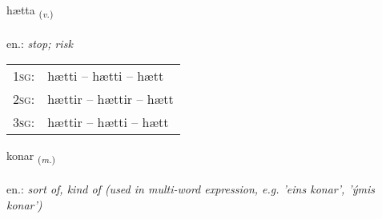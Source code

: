 \documentclass[frontgrid, backgrid]{flacards}\usepackage[]{graphicx}\usepackage[]{xcolor}
\begin{document}
\renewcommand{\blhead}{\vskip5pt {\small\bfseries\footnotesize Sagnorð | Verb }}
\renewcommand{\bcfoot}{\vskip5pt \hspace{2pt}{\small\bfseries\footnotesize 1K}}


{hætta \small{\textsubscript{(\textit{v.})}} \\[1ex] %
\textphonetic{[haihta]} \\
en.: \emph{stop; risk} \\  [2ex]
\renewcommand*{\arraystretch}{0.8}
\begin{tabular}{p{1cm}l}
\textsc{1sg}: & hætti -- hætti -- hætt \\ 
\textsc{2sg}: & hættir -- hættir -- hætt \\ 
\textsc{3sg}: & hættir -- hætti -- hætt \\ 
\end{tabular}
}

\renewcommand{\flhead}{\vskip5pt \fboxsep=0pt {\small\bfseries\footnotesize Nafnorð | Noun}}
\renewcommand{\fcfoot}{\vskip5pt \fboxsep=0pt \hspace{2pt}{\small\bfseries\footnotesize 1K}}

\renewcommand{\blhead}{\vskip5pt {\small\bfseries\footnotesize Nafnorð | Noun }}
\renewcommand{\bcfoot}{\vskip5pt \hspace{2pt}{\small\bfseries\footnotesize 1K}}


{konar \small{\textsubscript{(\textit{m.})}} \\[1ex] %
\textphonetic{[kʰɔːnar]} \\
en.: \emph{sort of, kind of (used in multi-word expression, e.g. 'eins konar', 'ýmis konar')} \\  [2ex]
\renewcommand*{\arraystretch}{0.8}
}
\end{document}
